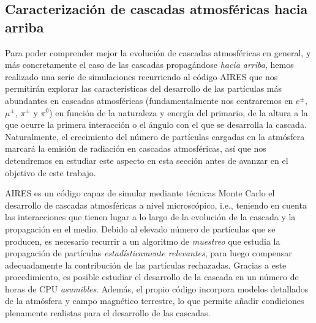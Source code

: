 \documentclass[12 pt, a4paper]{article} %
\numberwithin{equation}{section}
\numberwithin{figure}{section}
\numberwithin{table}{section}
\begin{document}
	\subsection{Caracterización de cascadas atmosféricas hacia arriba}\label{sec22}
	Para poder comprender mejor la evolución de cascadas atmosféricas en general, y más concretamente el caso de las cascadas propagándose \textit{hacia arriba}, hemos realizado una serie de simulaciones recurriendo al código AIRES \cite{https://doi.org/10.13140/rg.2.2.12566.40002} que nos permitirán explorar las características del desarrollo de las partículas más abundantes en cascadas atmosféricas (fundamentalmente nos centraremos en $e^\pm$, $\mu^\pm$, $\pi^\pm$ y $\pi^0$) en función de la naturaleza y energía del primario, de la altura a la que ocurre la primera interacción o el ángulo con el que se desarrolla la cascada. Naturalmente, el crecimiento del número de partículas cargadas en la atmósfera marcará la emisión de radiación en cascadas atmosféricas, así que nos detendremos en estudiar este aspecto en esta sección antes de avanzar en el objetivo de este trabajo.
	
	AIRES es un código capaz de simular mediante técnicas Monte Carlo el desarrollo de cascadas atmosféricas a nivel microscópico, i.e., teniendo en cuenta las interacciones que tienen lugar a lo largo de la evolución de la cascada y la propagación en el medio. Debido al elevado número de partículas que se producen, es necesario recurrir a un algoritmo de \textit{muestreo} que estudia la propagación de partículas \textit{estadísticamente relevantes}, para luego compensar adecuadamente la contribución de las partículas rechazadas. Gracias a este procedimiento, es posible estudiar el desarrollo de la cascada en un número de horas de CPU \textit{asumibles}. Además, el propio código incorpora modelos detallados de la atmósfera y campo magnético terrestre, lo que permite añadir condiciones plenamente realistas para el desarrollo de las cascadas.
	
\end{document}
